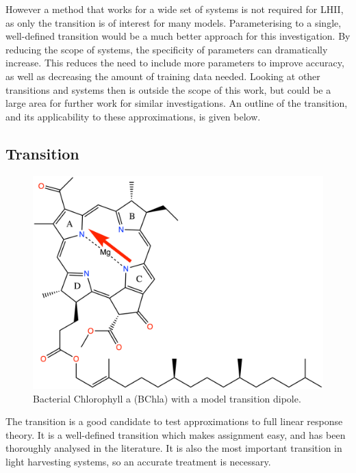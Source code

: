 However a method that works for a wide set of systems is not required for LHII,
as only the \Qy transition is of interest for many models. Parameterising to a 
single, well-defined transition would be a much better approach for this investigation.
By reducing the scope of systems, the specificity of parameters can dramatically increase. 
This reduces the need to include more parameters to improve accuracy, as well as 
decreasing the amount of training data needed. Looking at other transitions and
systems then is outside the scope of this work, but could be a large area for further
work for similar investigations. An outline of the \Qy transition, and its applicability
to these approximations, is given below.

\subsection{\Qy Transition}
\label{subsec:qy_transition}
\begin{figure}
    \centering
    \includegraphics{chapters/chapter03/chlorophyll_Qy.png}
    \caption{Bacterial Chlorophyll a (BChla) with a model \Qy transition dipole.}
    \label{fig:bchla_qy}
\end{figure}

The \Qy transition is a good candidate to test approximations to full linear response 
theory. It is a well-defined transition which makes assignment easy, and has been
thoroughly analysed in the literature. It is also the most important transition 
in light harvesting systems, so an accurate treatment is necessary. 

